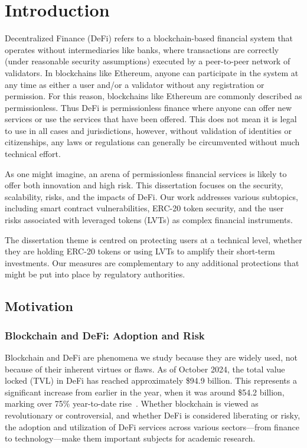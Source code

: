 
\chapter{Introduction}

Decentralized Finance (DeFi) refers to a blockchain-based financial system that operates without intermediaries like banks, where transactions are correctly (under reasonable security assumptions) executed by a peer-to-peer network of validators. In blockchains like Ethereum, anyone can participate in the system at any time as either a user and/or a validator without any registration or permission. For this reason, blockchains like Ethereum are commonly described as permissionless. Thus DeFi is permissionless finance where anyone can offer new services or use the services that have been offered. This does not mean it is legal to use in all cases and jurisdictions, however, without validation of identities or citizenships, any laws or regulations can generally be circumvented without much technical effort.

As one might imagine, an arena of permissionless financial services is likely to offer both innovation and high risk. This dissertation focuses on the security, scalability, risks, and the impacts of DeFi. Our work addresses various subtopics, including smart contract vulnerabilities, ERC-20 token security, and the user risks associated with leveraged tokens (LVTs) as complex financial instruments. 

The dissertation theme is centred on protecting users at a technical level, whether they are holding ERC-20 tokens or using LVTs to amplify their short-term investments. Our measures are complementary to any additional protections that might be put into place by regulatory authorities. 

\section{Motivation}
\subsection{Blockchain and DeFi: Adoption and Risk}
Blockchain and DeFi are phenomena we study because they are widely used, not because of their inherent virtues or flaws. As of October 2024, the total value locked (TVL) in DeFi has reached approximately \$94.9 billion. This represents a significant increase from earlier in the year, when it was around \$54.2 billion, marking over 75\% year-to-date rise~\cite{coingecko2024,binance2024}. Whether blockchain is viewed as revolutionary or controversial, and whether DeFi is considered liberating or risky, the adoption and utilization of DeFi services across various sectors—from finance to technology—make them important subjects for academic research. 

